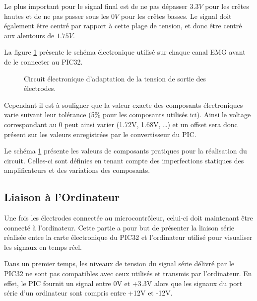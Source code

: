 \documentclass[letterpaper, twoside, 12pt, memoire, creativecommons, hyperref]{thETS}
\begin{document}
Le plus important pour le signal final est de ne pas dépasser $3.3V$ pour les crêtes hautes et de ne pas passer sous les $0V$ pour les crêtes basses. Le signal doit également être centré par rapport à cette plage de tension, et donc être centré aux alentours de $1.75V$.

La figure \ref{fig:adapttension} présente le schéma électronique utilisé sur chaque canal EMG avant de le connecter au PIC32.

\begin{figure}
	\centering
	\caption{Circuit électronique d'adaptation de la tension de sortie des électrodes.}
	\label{fig:adapttension}
\end{figure}

Cependant il est à souligner que la valeur exacte des composants électroniques varie suivant leur tolérance (5\% pour les composants utilisés ici). Ainsi le voltage correspondant au 0 peut ainsi varier (1.72V, 1.68V, …) et un offset sera donc présent sur les valeurs enregistrées par le convertisseur du PIC. 

Le schéma \ref{fig:adapttension} présente les valeurs de composants pratiques pour la réalisation du circuit. Celles-ci sont définies en tenant compte des imperfections statiques des amplificateurs et des variations des composants.


\subsection{Liaison à l'Ordinateur}

Une fois les électrodes connectée au microcontrôleur, celui-ci doit maintenant être connecté à l'ordinateur. Cette partie a pour but de présenter la liaison série réalisée entre la carte électronique du PIC32 et l'ordinateur utilisé pour visualiser les signaux en temps réel.

Dans un premier temps, les niveaux de tension du signal série délivré par le PIC32 ne sont pas compatibles avec ceux utilisés et transmis par l'ordinateur. En effet, le PIC fournit un signal entre 0V et +3.3V alors que les signaux du port série d'un ordinateur sont compris entre +12V et -12V. 
\end{document}
